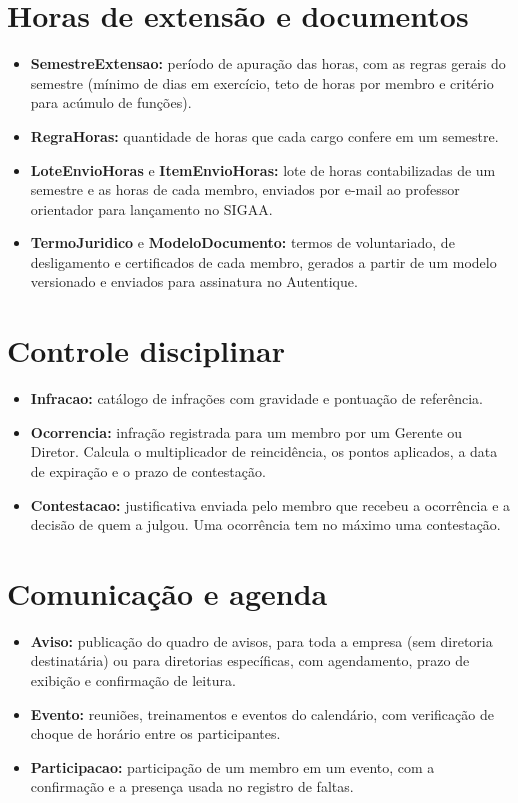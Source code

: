 \section{Horas de extensão e documentos}


\begin{itemize}
    \item \textbf{SemestreExtensao:} período de apuração das horas, com as regras gerais do semestre (mínimo de dias em exercício, teto de horas por membro e critério para acúmulo de funções).
    \item \textbf{RegraHoras:} quantidade de horas que cada cargo confere em um semestre.
    \item \textbf{LoteEnvioHoras} e \textbf{ItemEnvioHoras:} lote de horas contabilizadas de um semestre e as horas de cada membro, enviados por e-mail ao professor orientador para lançamento no SIGAA.
    \item \textbf{TermoJuridico} e \textbf{ModeloDocumento:} termos de voluntariado, de desligamento e certificados de cada membro, gerados a partir de um modelo versionado e enviados para assinatura no Autentique.
\end{itemize}

\section{Controle disciplinar}


\begin{itemize}
    \item \textbf{Infracao:} catálogo de infrações com gravidade e pontuação de referência.
    \item \textbf{Ocorrencia:} infração registrada para um membro por um Gerente ou Diretor. Calcula o multiplicador de reincidência, os pontos aplicados, a data de expiração e o prazo de contestação.
    \item \textbf{Contestacao:} justificativa enviada pelo membro que recebeu a ocorrência e a decisão de quem a julgou. Uma ocorrência tem no máximo uma contestação.
\end{itemize}

\section{Comunicação e agenda}


\begin{itemize}
    \item \textbf{Aviso:} publicação do quadro de avisos, para toda a empresa (sem diretoria destinatária) ou para diretorias específicas, com agendamento, prazo de exibição e confirmação de leitura.
    \item \textbf{Evento:} reuniões, treinamentos e eventos do calendário, com verificação de choque de horário entre os participantes.
    \item \textbf{Participacao:} participação de um membro em um evento, com a confirmação e a presença usada no registro de faltas.
\end{itemize}

